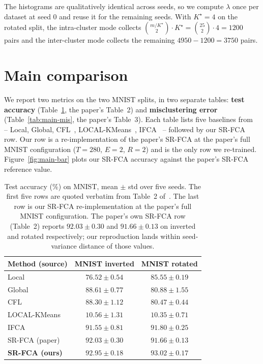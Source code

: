 The histograms are qualitatively identical across seeds, so we compute $\lambda$ once per dataset at seed $0$ and reuse it for the remaining seeds. With $K^\star = 4$ on the rotated split, the intra-cluster mode collects $\binom{m/K^\star}{2} \cdot K^\star = \binom{25}{2} \cdot 4 = 1200$ pairs and the inter-cluster mode collects the remaining $4950 - 1200 = 3750$ pairs.

\section{Main comparison}\label{sec:main-results}

We report two metrics on the two MNIST splits, in two separate tables: \textbf{test accuracy} (Table~\ref{tab:main-acc}, the paper's Table~2) and \textbf{misclustering error} (Table~\ref{tab:main-mis}, the paper's Table~3). Each table lists five baselines from~\parencite{vardhan2024srfca} -- Local, Global, CFL~\parencite{sattler2021cfl}, LOCAL-KMeans~\parencite{ghosh2019efficient}, IFCA~\parencite{ghosh2022ifca} -- followed by our SR-FCA row. Our row is a re-implementation of the paper's SR-FCA at the paper's full MNIST configuration ($T = 280$, $E = 2$, $R = 2$) and is the only row we re-trained. Figure~\ref{fig:main-bar} plots our SR-FCA accuracy against the paper's SR-FCA reference value.

\begin{table}[h]
\centering
\small
\begin{tabular}{lcc}
\toprule
Method (source) & MNIST inverted & MNIST rotated \\
\midrule
Local & $76.52 \pm 0.54$  & $85.55 \pm 0.19$ \\
Global & $88.61 \pm 0.77$  & $80.88 \pm 1.55$ \\
CFL & $88.30 \pm 1.12$  & $80.47 \pm 0.44$ \\
LOCAL-KMeans & $10.56 \pm 1.31$  & $10.35 \pm 0.71$ \\
IFCA & $91.55 \pm 0.81$  & $91.80 \pm 0.25$ \\
SR-FCA (paper)                             & $92.03 \pm 0.30$  & $91.66 \pm 0.13$ \\
\midrule
\textbf{SR-FCA (ours)}                     & $\mathbf{92.95 \pm 0.18}$ & $\mathbf{93.02 \pm 0.17}$ \\
\bottomrule
\end{tabular}
\caption{Test accuracy (\%) on MNIST, mean $\pm$ std over five seeds. The first five rows are quoted verbatim from Table~2 of~\parencite{vardhan2024srfca}. The last row is our SR-FCA re-implementation at the paper's full MNIST configuration. The paper's own SR-FCA row (Table~2) reports $92.03 \pm 0.30$ and $91.66 \pm 0.13$ on inverted and rotated respectively; our reproduction lands within seed-variance distance of those values.}\label{tab:main-acc}
\end{table}

